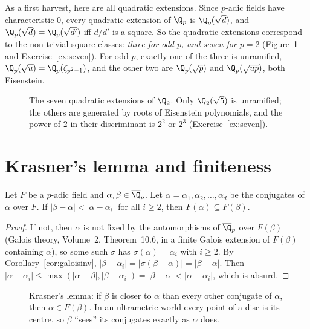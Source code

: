 As a first harvest, here are all quadratic extensions. Since $p$-adic fields have characteristic $0$, every quadratic extension of
$\Q_p$ is $\Q_p(\sqrt d)$, and $\Q_p(\sqrt d)=\Q_p(\sqrt{d'})$ iff $d/d'$ is a square. So the quadratic extensions correspond to the
non-trivial square classes: \emph{three for odd $p$, and seven for $p=2$} (Figure~\ref{fig:quadratic2} and Exercise~\ref{ex:seven}).
For odd $p$, exactly one of the three is unramified, $\Q_p(\sqrt u)=\Q_p(\zeta_{p^2-1})$, and the other two are $\Q_p(\sqrt p)$ and
$\Q_p(\sqrt{up})$, both Eisenstein.

\begin{figure}[ht]
\centering
{}
\caption{The seven quadratic extensions of $\Q_2$. Only $\Q_2(\sqrt5)$ is unramified; the others are generated by roots of
Eisenstein polynomials, and the power of $2$ in their discriminant is $2^2$ or $2^3$ (Exercise~\ref{ex:seven}).}
\label{fig:quadratic2}
\end{figure}

\section{Krasner's lemma and finiteness}

\begin{lemma}[Krasner, 1946]\label{lem:krasner}
Let $F$ be a $p$-adic field and $\alpha,\beta\in\overline{\Q}_p$. Let $\alpha=\alpha_1,\alpha_2,\dots,\alpha_d$ be the conjugates of
$\alpha$ over $F$. If $|\beta-\alpha|<|\alpha-\alpha_i|$ for all $i\ge2$, then $F(\alpha)\subseteq F(\beta)$.
\end{lemma}
\begin{proof}
If not, then $\alpha$ is not fixed by the automorphisms of $\overline{\Q}_p$ over $F(\beta)$ (Galois theory, Volume~2, Theorem~10.6,
in a finite Galois extension of $F(\beta)$ containing $\alpha$), so some such $\sigma$ has $\sigma(\alpha)=\alpha_i$ with $i\ge2$.
By Corollary~\ref{cor:galoisinv}, $|\beta-\alpha_i|=|\sigma(\beta-\alpha)|=|\beta-\alpha|$. Then
$|\alpha-\alpha_i|\le\max(|\alpha-\beta|,|\beta-\alpha_i|)=|\beta-\alpha|<|\alpha-\alpha_i|$, which is absurd.
\end{proof}

\begin{figure}[ht]
\centering
{}
\caption{Krasner's lemma: if $\beta$ is closer to $\alpha$ than every other conjugate of $\alpha$, then $\alpha\in F(\beta)$. In
an ultrametric world every point of a disc is its centre, so $\beta$ ``sees'' its conjugates exactly as $\alpha$ does.}
\label{fig:krasner}
\end{figure}

